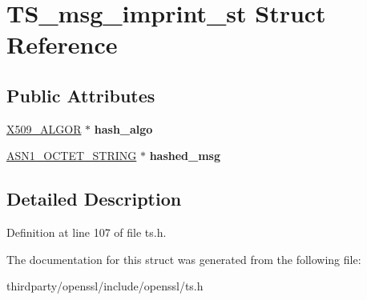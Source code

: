 \hypertarget{struct_t_s__msg__imprint__st}{}\section{T\+S\+\_\+msg\+\_\+imprint\+\_\+st Struct Reference}
\label{struct_t_s__msg__imprint__st}
\subsection*{Public Attributes}
\begin{DoxyCompactItemize}
\item 
\mbox{\label{struct_t_s__msg__imprint__st_aa0d4da96ba582b7b29ffe2acd192d10e}} 
\hyperlink{struct_x509__algor__st}{X509\+\_\+\+A\+L\+G\+OR} $\ast$ {\bfseries hash\+\_\+algo}
\item 
\mbox{\label{struct_t_s__msg__imprint__st_a0be6581788c745f9e1d872c47d511dad}} 
\hyperlink{structasn1__string__st}{A\+S\+N1\+\_\+\+O\+C\+T\+E\+T\+\_\+\+S\+T\+R\+I\+NG} $\ast$ {\bfseries hashed\+\_\+msg}
\end{DoxyCompactItemize}


\subsection{Detailed Description}


Definition at line 107 of file ts.\+h.



The documentation for this struct was generated from the following file\+:\begin{DoxyCompactItemize}
\item 
thirdparty/openssl/include/openssl/ts.\+h\end{DoxyCompactItemize}
